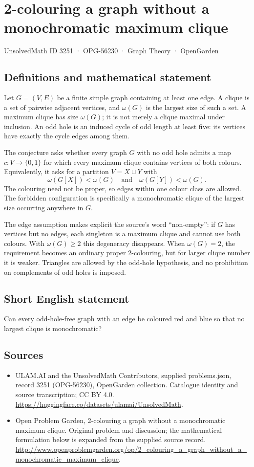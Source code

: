 \documentclass[11pt,a4paper]{article}
\begin{document}
\section*{2-colouring a graph without a monochromatic maximum clique}\label{3251}
{\small UnsolvedMath ID 3251 · OPG-56230 · Graph Theory · OpenGarden}
\subsection{Definitions and mathematical statement}
Let $G=(V,E)$ be a finite simple graph containing at least one edge. A
clique is a set of pairwise adjacent vertices, and $\omega(G)$ is the
largest size of such a set. A maximum clique has size $\omega(G)$; it is
not merely a clique maximal under inclusion. An odd hole is an induced
cycle of odd length at least five: its vertices have exactly the cycle
edges among them.

The conjecture asks whether every graph $G$ with no odd hole admits a
map $c:V\to\{0,1\}$ for which every maximum clique contains vertices of
both colours. Equivalently, it asks for a partition $V=X\sqcup Y$ with
\[
                 \omega(G[X])<\omega(G)
                 \quad\text{and}\quad
                 \omega(G[Y])<\omega(G).
\]
The colouring need not be proper, so edges within one colour class are
allowed. The forbidden configuration is specifically a monochromatic
clique of the largest size occurring anywhere in $G$.

The edge assumption makes explicit the source's word ``non-empty'': if
$G$ has vertices but no edges, each singleton is a maximum clique and
cannot use both colours. With $\omega(G)\ge2$ this degeneracy disappears.
When $\omega(G)=2$, the requirement becomes an ordinary proper
2-colouring, but for larger clique number it is weaker. Triangles are
allowed by the odd-hole hypothesis, and no prohibition on complements
of odd holes is imposed.
\subsection{Short English statement}
Can every odd-hole-free graph with an edge be coloured red and blue so that no largest clique is monochromatic?
\subsection{Sources}
\begin{itemize}
\item[S1] ULAM.AI and the UnsolvedMath Contributors, supplied problems.json, record 3251 (OPG-56230), OpenGarden collection. Catalogue identity and source transcription; CC BY 4.0.
\url{https://huggingface.co/datasets/ulamai/UnsolvedMath}.
\item[S2] Open Problem Garden, 2-colouring a graph without a monochromatic maximum clique. Original problem and discussion; the mathematical formulation below is expanded from the supplied source record.
\url{http://www.openproblemgarden.org/op/2_colouring_a_graph_without_a_monochromatic_maximum_clique}.
\end{itemize}
\end{document}
